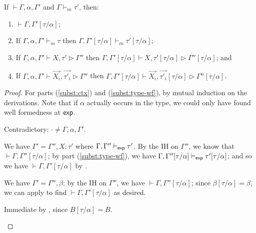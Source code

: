 \documentclass[acmsmall,screen,nonacm]{acmart}
\theoremstyle{definition}
\begin{document}
\begin{lemma}
\label{lem:substitution}
  If $\vdash \Gamma,\alpha,\Gamma'$ and $\Gamma \vdash_m \tau'$, then:
%
\begin{enumerate}
\item \label{subst:ctx} $\vdash \Gamma,\Gamma'[\tau/\alpha]$;

\item \label{subst:type-wf} If $\Gamma,\alpha,\Gamma' \vdash_m \tau$ then $\Gamma,\Gamma'[\tau/\alpha] \vdash_m \tau'[\tau/\alpha]$;

\item \label{subst:binding} If $\Gamma,\alpha,\Gamma' \vdash X, \tau' \rhd \Gamma''$ then
$\Gamma,\Gamma'[\tau/\alpha] \vdash X, \tau'[\tau/\alpha] \rhd \Gamma''[\tau/\alpha]$; and

\item \label{subst:binding-vec} If $\Gamma,\alpha,\Gamma' \vdash \vec{X_i}, \vec{\tau'_i} \rhd \Gamma''$ then
$\Gamma,\Gamma'[\tau/\alpha] \vdash \vec{X_i}, \vec{\tau'_i}[\tau/\alpha] \rhd \Gamma''[\tau/\alpha]$.

\end{enumerate}
%
\begin{proof}

  For parts (\ref{subst:ctx}) and (\ref{subst:type-wf}), by mutual
  induction on the derivations. Note that if $\alpha$ actually occurs
  in the type, we could only have found well formedness at $\mathsf{exp}$.
%
\begin{proofcases}

\item[(\rn{$\Gamma$-Empty})] Contradictory: $\cdot \neq \Gamma,\alpha,\Gamma'$.

\item[(\rn{$\Gamma$-Var})] We have $\Gamma' = \Gamma'',X:\tau'$ where $\Gamma,\Gamma'' \vdash_{\mathsf{exp}} \tau'$. By the IH on $\Gamma''$, we know that $\vdash \Gamma,\Gamma''[\tau/\alpha]$; by part (\ref{subst:type-wf}), we have $\Gamma,\Gamma''[\tau/\alpha] \vdash_{\mathsf{exp}} \tau'[\tau/\alpha]$; and so we have $\vdash \Gamma,\Gamma'[\tau/\alpha]$ by .

\item[(\rn{$\Gamma$-TVar})] We have $\Gamma' = \Gamma'',\beta$; by the IH on $\Gamma''$, we have $\vdash \Gamma,\Gamma''[\tau/\alpha]$; since $\beta[\tau/\alpha] = \beta$, we can apply  to find $\vdash \Gamma,\Gamma'[\tau/\alpha]$ as desired.

\item[(\rn{$t$-B})] Immediate by , since $B[\tau/\alpha] = B$.


\end{proofcases}
\end{proof}
\end{lemma}
\end{document}
